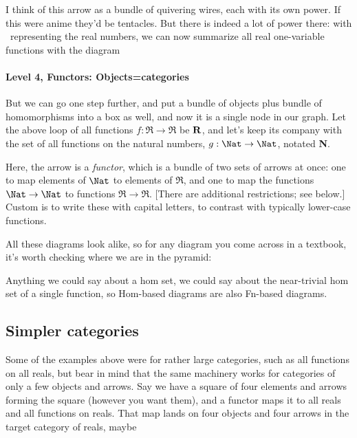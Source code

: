 \documentclass[11pt]{article}
\begin{document}
I think of this arrow as a bundle of quivering wires, each with its own power. If this were anime
they'd be tentacles. But there is indeed a lot of power there: with \Re\ representing the
real numbers, we can now summarize all real one-variable functions with the diagram 

\paragraph{Level 4, Functors: Objects=categories}
But we can go one step
further, and put a bundle of objects plus bundle of homomorphisms into a box as well, and
now it is a single node in our graph. Let the above loop of all functions $f:\Re\to\Re$
be $\bf R$, and let's keep its company with the set of all functions on the natural
numbers, $g:\Nat\to\Nat$, notated {\bf N}.


Here, the arrow is a {\em functor}, which is a bundle of two sets of arrows at once:
one to map elements of $\Nat$ to elements of $\Re$, and one to map the functions
$\Nat\to \Nat$ to functions $\Re\to \Re$. [There are additional restrictions; see
below.] Custom is to write these with capital letters, to contrast with typically
lower-case functions.

All these diagrams look alike, so for any diagram you come across in a textbook, it's
worth checking where we are in the pyramid:

Anything we could say about a hom set, we could say about the near-trivial hom
set of a single function, so Hom-based diagrams are also Fn-based diagrams.

\subsection{Simpler categories}
Some of the examples above were for rather large categories, such as all functions on all
reals, but bear in mind that the same machinery works for categories of only a few objects
and arrows. Say we have a square of four elements and arrows forming the square (however
you want them), and a functor maps it to all reals and all functions on reals. That map
lands on four objects and four arrows in the target category of reals, maybe
\end{document}
